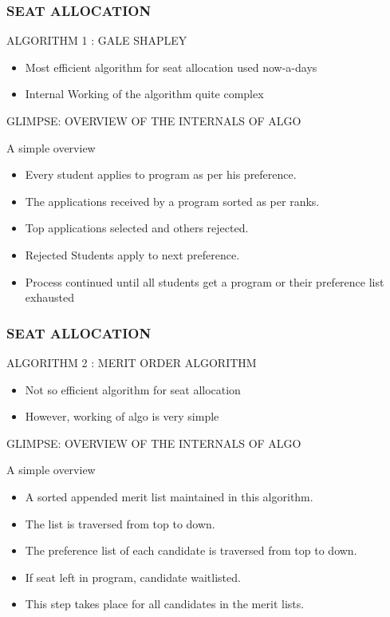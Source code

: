 \documentclass{beamer}
\begin{document}
\begin{frame}
\frametitle{SEAT ALLOCATION}
ALGORITHM 1 : GALE SHAPLEY \pause
\begin{itemize}
\item Most efficient algorithm for seat allocation used now-a-days \pause
\item Internal Working of the algorithm quite complex \pause
\end{itemize}

\alert{GLIMPSE: OVERVIEW  OF THE INTERNALS OF ALGO} 
\begin{block}{A simple overview}
\begin{itemize}
\item Every student applies to program as per his preference.\pause 
\item The applications received by a program sorted as per ranks. 
\item Top applications selected and others rejected.\pause 
\item Rejected Students apply to next preference.\pause 
\item Process continued until all students get a program or their preference list exhausted
\end{itemize}
\end{block}
\end{frame}


\begin{frame}
\frametitle{SEAT ALLOCATION}
ALGORITHM 2 : MERIT ORDER ALGORITHM
\begin{itemize}
\item Not so efficient algorithm for seat allocation \pause
\item However, working of algo is very simple \pause
\end{itemize}

\alert{GLIMPSE: OVERVIEW OF THE INTERNALS OF ALGO}
\begin{block}{A simple overview}
\begin{itemize}
\item A sorted appended merit list maintained in this algorithm. 
\item The list is traversed from top to down.\pause 
\item The preference list of each candidate is traversed from top to down. 
\item If seat left in program, candidate waitlisted. \pause 
\item This step takes place for all candidates in the merit lists.
\end{itemize}  
\end{block}

\end{frame}
\end{document}
